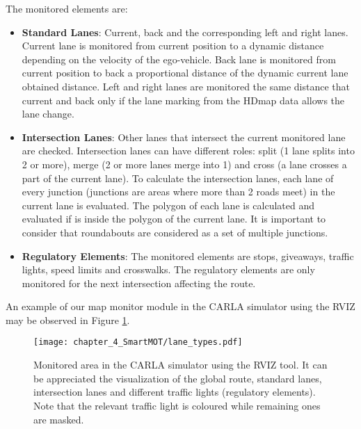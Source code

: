 The monitored elements are:

\begin{itemize}
	
	\item \textbf{Standard Lanes}: Current, back and the corresponding left and right lanes. Current lane is monitored from current position to a dynamic distance depending on the velocity of the ego-vehicle. Back lane is monitored from current position to back a proportional distance of the dynamic current lane obtained distance. Left and right lanes are monitored the same distance that current and back only if the lane marking from the \ac{HDmap} data allows the lane change.
	
	\item \textbf{Intersection Lanes}: Other lanes that intersect the current monitored lane are checked. Intersection lanes can have different roles: split (1 lane splits into 2 or more), merge (2 or more lanes merge into 1) and cross (a lane crosses a part of the current lane). To calculate the intersection lanes, each lane of every junction (junctions are areas where more than 2 roads meet) in the current lane is evaluated. The polygon of each lane is calculated and evaluated if is inside the polygon of the current lane. It is important to consider that roundabouts are considered as a set of multiple junctions. 
	
	\item \textbf{Regulatory Elements}: The monitored elements are stops, giveaways, traffic lights, speed limits and crosswalks. The regulatory elements are only monitored for the next intersection affecting the route. 
	
\end{itemize}

An example of our map monitor module in the CARLA simulator \cite{dosovitskiy2017carla} using the \ac{RVIZ} \cite{quigley2009ros} may be observed in Figure \ref{fig:chapter_4_SmartMOT/monitored_area_CARLA_ROS}.

\begin{figure}[h] 
	\centering
	\texttt{[image: chapter\_4\_SmartMOT/lane\_types.pdf]}
	\captionsetup{justification=justified}
	\caption[Monitored area in the CARLA simulator using the \ac{RVIZ} tool]{Monitored area in the CARLA simulator using the \ac{RVIZ} tool. It can be appreciated the visualization of the global route, standard lanes, intersection lanes and different traffic lights (regulatory elements). Note that the relevant traffic light is coloured while remaining ones are masked.}
	\label{fig:chapter_4_SmartMOT/monitored_area_CARLA_ROS}
\end{figure}

